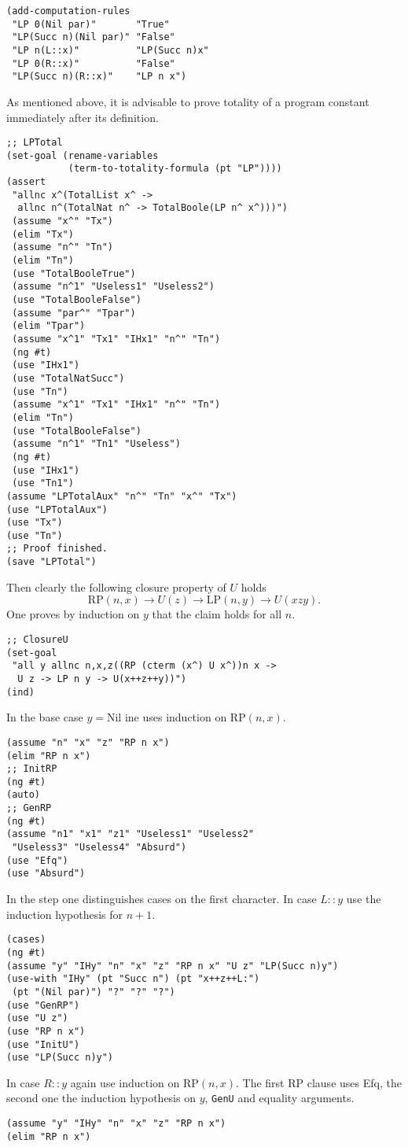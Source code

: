 \documentclass[12pt]{amsart}
\newcommand{\nil}{\mathrm{Nil}}
\begin{document}
\begin{appendix}
\begin{verbatim}
(add-computation-rules
 "LP 0(Nil par)"       "True"
 "LP(Succ n)(Nil par)" "False"
 "LP n(L::x)"          "LP(Succ n)x"
 "LP 0(R::x)"          "False"
 "LP(Succ n)(R::x)"    "LP n x")
\end{verbatim}
As mentioned above, it is advisable to prove totality of a program
constant immediately after its definition.
\begin{verbatim}
;; LPTotal
(set-goal (rename-variables
           (term-to-totality-formula (pt "LP"))))
(assert
 "allnc x^(TotalList x^ ->
  allnc n^(TotalNat n^ -> TotalBoole(LP n^ x^)))")
 (assume "x^" "Tx")
 (elim "Tx")
 (assume "n^" "Tn")
 (elim "Tn")
 (use "TotalBooleTrue")
 (assume "n^1" "Useless1" "Useless2")
 (use "TotalBooleFalse")
 (assume "par^" "Tpar")
 (elim "Tpar")
 (assume "x^1" "Tx1" "IHx1" "n^" "Tn")
 (ng #t)
 (use "IHx1")
 (use "TotalNatSucc")
 (use "Tn")
 (assume "x^1" "Tx1" "IHx1" "n^" "Tn")
 (elim "Tn")
 (use "TotalBooleFalse")
 (assume "n^1" "Tn1" "Useless")
 (ng #t)
 (use "IHx1")
 (use "Tn1")
(assume "LPTotalAux" "n^" "Tn" "x^" "Tx")
(use "LPTotalAux")
(use "Tx")
(use "Tn")
;; Proof finished.
(save "LPTotal")
\end{verbatim}
Then clearly the following closure property of $U$ holds
\begin{equation*}
  \mathrm{RP}(n,x) \to U(z) \to \mathrm{LP}(n,y) \to U(xzy).
\end{equation*}
One proves by induction on $y$ that the claim holds for all $n$.
\begin{verbatim}
;; ClosureU
(set-goal
 "all y allnc n,x,z((RP (cterm (x^) U x^))n x ->
  U z -> LP n y -> U(x++z++y))")
(ind)
\end{verbatim}
In the base case $y=\nil$ ine uses induction on $\mathrm{RP}(n,x)$.
\begin{verbatim}
(assume "n" "x" "z" "RP n x")
(elim "RP n x")
;; InitRP
(ng #t)
(auto)
;; GenRP
(ng #t)
(assume "n1" "x1" "z1" "Useless1" "Useless2"
 "Useless3" "Useless4" "Absurd")
(use "Efq")
(use "Absurd")
\end{verbatim}
In the step one distinguishes cases on the first character.  In case
$L::y$ use the induction hypothesis for $n+1$.
\begin{verbatim}
(cases)
(ng #t)
(assume "y" "IHy" "n" "x" "z" "RP n x" "U z" "LP(Succ n)y")
(use-with "IHy" (pt "Succ n") (pt "x++z++L:")
 (pt "(Nil par)") "?" "?" "?")
(use "GenRP")
(use "U z")
(use "RP n x")
(use "InitU")
(use "LP(Succ n)y")
\end{verbatim}
In case $R::y$ again use induction on $\mathrm{RP}(n,x)$.  The first
$\mathrm{RP}$ clause uses Efq, the second one the induction hypothesis
on $y$, \verb|GenU| and equality arguments.
\begin{verbatim}
(assume "y" "IHy" "n" "x" "z" "RP n x")
(elim "RP n x")


\end{verbatim}
\end{appendix}
\end{document}
